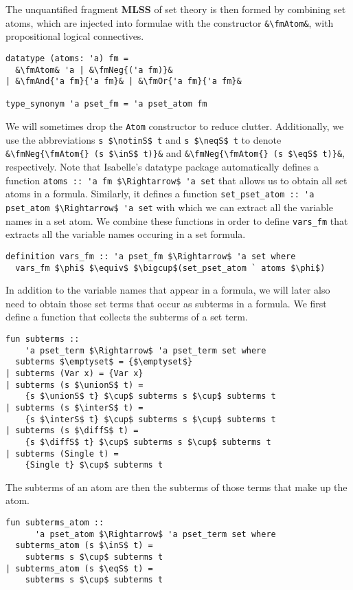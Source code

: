 \documentclass[sigplan,10pt,anonymous,review]{acmart}
\newcommand{\MLSS}{\textbf{MLSS}}
\newcommand{\unionS}{\sqcup_\text{s}}
\newcommand{\interS}{\sqcap_\text{s}}
\newcommand{\diffS}{-_\text{s}}
\newcommand{\inS}{\in_\text{s}}
\newcommand{\notinS}{\notin_\text{s}}
\newcommand{\eqS}{\approx_\text{s}}
\newcommand{\neqS}{{\not\approx}_\text{s}}
\newcommand{\fmAnd}[2]{#1 $\boldsymbol{\land}$ #2}
\newcommand{\fmOr}[2]{#1 $\boldsymbol{\lor}$ #2}
\newcommand{\fmNeg}[1]{$\boldsymbol{\neg}$ #1}
\newcommand{\fmAtom}{\textbf{A}}
\begin{document}
The unquantified fragment \MLSS{} of set theory is then formed by combining set atoms, which are injected into formulae with the constructor \lstinline!&\fmAtom&!, with propositional logical connectives.
\begin{lstlisting}
datatype (atoms: 'a) fm =
  &\fmAtom& 'a | &\fmNeg{('a fm)}&
| &\fmAnd{'a fm}{'a fm}& | &\fmOr{'a fm}{'a fm}&

type_synonym 'a pset_fm = 'a pset_atom fm
\end{lstlisting}
We will sometimes drop the \lstinline!Atom! constructor to reduce clutter.
Additionally, we use the abbreviations \lstinline!s $\notinS$ t! and \lstinline!s $\neqS$ t! to denote \lstinline!&\fmNeg{\fmAtom{} (s $\inS$ t)}&! and \lstinline!&\fmNeg{\fmAtom{} (s $\eqS$ t)}&!, respectively.
Note that Isabelle's datatype package automatically defines a function \lstinline!atoms :: 'a fm $\Rightarrow$ 'a set! that allows us to obtain all set atoms in a formula.
Similarly, it defines a function \lstinline!set_pset_atom :: 'a pset_atom $\Rightarrow$ 'a set! with which we can extract all the variable names in a set atom.
We combine these functions in order to define \lstinline!vars_fm! that extracts all the variable names occuring in a set formula.
\begin{lstlisting}
definition vars_fm :: 'a pset_fm $\Rightarrow$ 'a set where
  vars_fm $\phi$ $\equiv$ $\bigcup$(set_pset_atom ` atoms $\phi$)
\end{lstlisting}
In addition to the variable names that appear in a formula, we will later also need to obtain those set terms that occur as subterms in a formula. 
We first define a function that collects the subterms of a set term.
\begin{lstlisting}
fun subterms ::
    'a pset_term $\Rightarrow$ 'a pset_term set where
  subterms $\emptyset$ = {$\emptyset$}
| subterms (Var x) = {Var x}
| subterms (s $\unionS$ t) =
    {s $\unionS$ t} $\cup$ subterms s $\cup$ subterms t
| subterms (s $\interS$ t) =
    {s $\interS$ t} $\cup$ subterms s $\cup$ subterms t
| subterms (s $\diffS$ t) =
    {s $\diffS$ t} $\cup$ subterms s $\cup$ subterms t
| subterms (Single t) =
    {Single t} $\cup$ subterms t
\end{lstlisting}
The subterms of an atom are then the subterms of those terms that make up the atom.
\begin{lstlisting}
fun subterms_atom ::
      'a pset_atom $\Rightarrow$ 'a pset_term set where
  subterms_atom (s $\inS$ t) =
    subterms s $\cup$ subterms t
| subterms_atom (s $\eqS$ t) =
    subterms s $\cup$ subterms t
\end{lstlisting}
\end{document}
